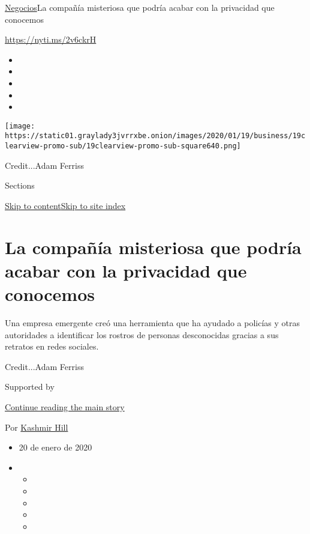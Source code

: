 \href{/es/section/negocios}{Negocios}\textbar{}La compañía misteriosa
que podría acabar con la privacidad que conocemos

\url{https://nyti.ms/2v6ckrH}

\begin{itemize}
\item
\item
\item
\item
\item
\end{itemize}

\texttt{[image: https://static01.graylady3jvrrxbe.onion/images/2020/01/19/business/19clearview-promo-sub/19clearview-promo-sub-square640.png]}

Credit...Adam Ferriss

Sections

\protect\hyperlink{site-content}{Skip to
content}\protect\hyperlink{site-index}{Skip to site index}

\hypertarget{la-compauxf1uxeda-misteriosa-que-podruxeda-acabar-con-la-privacidad-que-conocemos}{%
\section{La compañía misteriosa que podría acabar con la privacidad que
conocemos}\label{la-compauxf1uxeda-misteriosa-que-podruxeda-acabar-con-la-privacidad-que-conocemos}}

Una empresa emergente creó una herramienta que ha ayudado a policías y
otras autoridades a identificar los rostros de personas desconocidas
gracias a sus retratos en redes sociales.

Credit...Adam Ferriss

Supported by

\protect\hyperlink{after-sponsor}{Continue reading the main story}

Por \href{https://www.nytimes3xbfgragh.onion/by/kashmir-hill}{Kashmir
Hill}

\begin{itemize}
\item
  20 de enero de 2020
\item
  \begin{itemize}
  \item
  \item
  \item
  \item
  \item
  \end{itemize}
\end{itemize}

